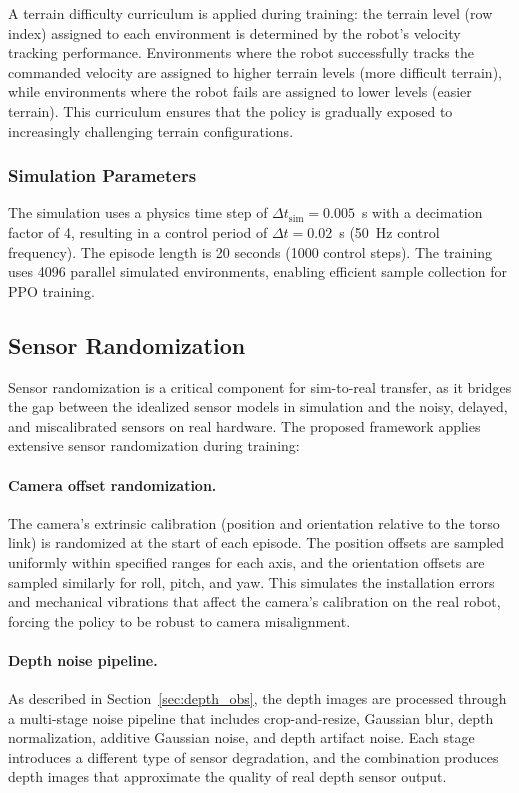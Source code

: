 A terrain difficulty curriculum is applied during training: the terrain level (row index) assigned to each environment is determined by the robot's velocity tracking performance. Environments where the robot successfully tracks the commanded velocity are assigned to higher terrain levels (more difficult terrain), while environments where the robot fails are assigned to lower levels (easier terrain). This curriculum ensures that the policy is gradually exposed to increasingly challenging terrain configurations.

\subsubsection{Simulation Parameters}

The simulation uses a physics time step of $\Delta t_{\text{sim}} = 0.005$~s with a decimation factor of 4, resulting in a control period of $\Delta t = 0.02$~s (50~Hz control frequency). The episode length is 20 seconds (1000 control steps). The training uses 4096 parallel simulated environments, enabling efficient sample collection for PPO training.

\subsection{Sensor Randomization}
\label{sec:sensor_randomization}

Sensor randomization is a critical component for sim-to-real transfer, as it bridges the gap between the idealized sensor models in simulation and the noisy, delayed, and miscalibrated sensors on real hardware. The proposed framework applies extensive sensor randomization during training:

\paragraph{Camera offset randomization.}
The camera's extrinsic calibration (position and orientation relative to the torso link) is randomized at the start of each episode. The position offsets are sampled uniformly within specified ranges for each axis, and the orientation offsets are sampled similarly for roll, pitch, and yaw. This simulates the installation errors and mechanical vibrations that affect the camera's calibration on the real robot, forcing the policy to be robust to camera misalignment.

\paragraph{Depth noise pipeline.}
As described in Section~\ref{sec:depth_obs}, the depth images are processed through a multi-stage noise pipeline that includes crop-and-resize, Gaussian blur, depth normalization, additive Gaussian noise, and depth artifact noise. Each stage introduces a different type of sensor degradation, and the combination produces depth images that approximate the quality of real depth sensor output.

